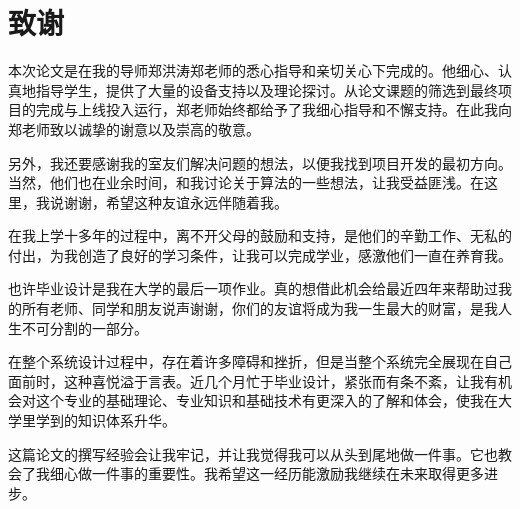 \thispagestyle{acknowledge}
\section*{致谢}

本次论文是在我的导师郑洪涛郑老师的悉心指导和亲切关心下完成的。他细心、认真地指导学生，提供了大量的设备支持以及理论探讨。从论文课题的筛选到最终项目的完成与上线投入运行，郑老师始终都给予了我细心指导和不懈支持。在此我向郑老师致以诚挚的谢意以及崇高的敬意。

另外，我还要感谢我的室友们解决问题的想法，以便我找到项目开发的最初方向。当然，他们也在业余时间，和我讨论关于算法的一些想法，让我受益匪浅。在这里，我说谢谢，希望这种友谊永远伴随着我。

在我上学十多年的过程中，离不开父母的鼓励和支持，是他们的辛勤工作、无私的付出，为我创造了良好的学习条件，让我可以完成学业，感激他们一直在养育我。

也许毕业设计是我在大学的最后一项作业。真的想借此机会给最近四年来帮助过我的所有老师、同学和朋友说声谢谢，你们的友谊将成为我一生最大的财富，是我人生不可分割的一部分。

在整个系统设计过程中，存在着许多障碍和挫折，但是当整个系统完全展现在自己面前时，这种喜悦溢于言表。近几个月忙于毕业设计，紧张而有条不紊，让我有机会对这个专业的基础理论、专业知识和基础技术有更深入的了解和体会，使我在大学里学到的知识体系升华。

这篇论文的撰写经验会让我牢记，并让我觉得我可以从头到尾地做一件事。它也教会了我细心做一件事的重要性。我希望这一经历能激励我继续在未来取得更多进步。
